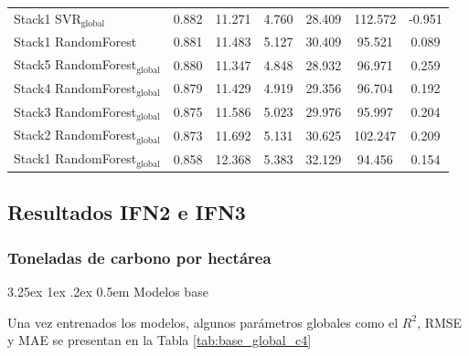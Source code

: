 \documentclass[a4paper,twocolumn]{article}
\makeatletter
\renewcommand\paragraph{\@startsection{paragraph}{4}{\z@}%
  {3.25ex \@plus1ex \@minus.2ex}%
  {0.5em}%
  {\normalfont\normalsize\bfseries}}
\newcommand{\subsubsubsection}[1]{\paragraph{#1}}
\makeatother
\begin{document}
\begin{table}
{\begin{tabular}{p{4.5cm}cccccc}
        Stack1 SVR$_{\text{global}}$ & 0.882 & 11.271 & 4.760 & 28.409 & 112.572 & -0.951 \\
        Stack1 RandomForest & 0.881 & 11.483 & 5.127 & 30.409 & 95.521 & 0.089 \\
        Stack5 RandomForest$_{\text{global}}$ & 0.880 & 11.347 & 4.848 & 28.932 & 96.971 & 0.259 \\
        Stack4 RandomForest$_{\text{global}}$ & 0.879 & 11.429 & 4.919 & 29.356 & 96.704 & 0.192 \\
        Stack3 RandomForest$_{\text{global}}$ & 0.875 & 11.586 & 5.023 & 29.976 & 95.997 & 0.204 \\
        Stack2 RandomForest$_{\text{global}}$ & 0.873 & 11.692 & 5.131 & 30.625 & 102.247 & 0.209 \\
        Stack1 RandomForest$_{\text{global}}$ & 0.858 & 12.368 & 5.383 & 32.129 & 94.456 & 0.154 \\
            \bottomrule
    \end{tabular}
    }
\end{table}

\subsection{Resultados IFN2 e IFN3}


\subsubsection{Toneladas de carbono por hectárea}

\subsubsubsection{Modelos base}

Una vez entrenados los modelos, algunos parámetros globales como el $R^2$, RMSE y MAE se presentan en la Tabla \ref{tab:base_global_c4}
\end{document}
